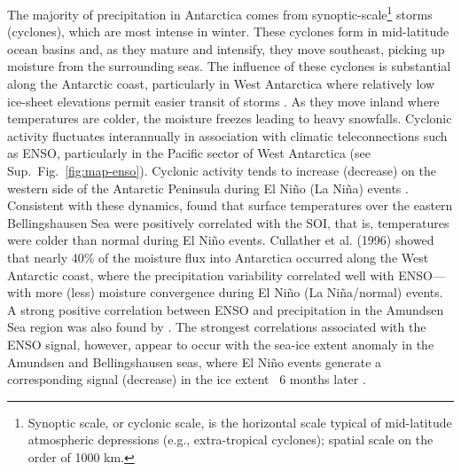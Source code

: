 The majority of precipitation in Antarctica comes from synoptic-scale\footnote{Synoptic scale, or cyclonic scale, is the horizontal scale typical of mid-latitude atmospheric depressions (e.g., extra-tropical cyclones); spatial scale on the order of 1000 km.} storms (cyclones), which are most intense in winter. These cyclones form in mid-latitude ocean basins and, as they mature and intensify, they move southeast, picking up moisture from the surrounding seas. The influence of these cyclones is substantial along the Antarctic coast, particularly in West Antarctica where relatively low ice-sheet elevations permit easier transit of storms \parencite{Riffenburgh2007}. As they move inland where temperatures are colder, the moisture freezes leading to heavy snowfalls. Cyclonic activity fluctuates interannually in association with climatic teleconnections such as ENSO, particularly in the Pacific sector of West Antarctica (see Sup.~Fig.~\ref{fig:map-enso}). Cyclonic activity tends to increase (decrease) on the western side of the Antarctic Peninsula during El Ni\~no (La Ni\~na) events \parencite{Riffenburgh2007}. Consistent with these dynamics, \textcite{Kwok2002} found that surface temperatures over the eastern Bellingshausen Sea were positively correlated with the SOI, that is, temperatures were colder than normal during El Ni\~no events. Cullather et al. (1996) showed that nearly 40\% of the moisture flux into Antarctica occurred along the West Antarctic coast, where the precipitation variability correlated well with ENSO---with more (less) moisture convergence during El Ni\~no (La Ni\~na/normal) events. A strong positive correlation between ENSO and precipitation in the Amundsen Sea region was also found by \textcite{Genthon2003}. The strongest correlations associated with the ENSO signal, however, appear to occur with the sea-ice extent anomaly in the Amundsen and Bellingshausen seas, where El Ni\~no events generate a corresponding signal (decrease) in the ice extent ~6 months later \parencite{Yuan2000, Turner2004}.


